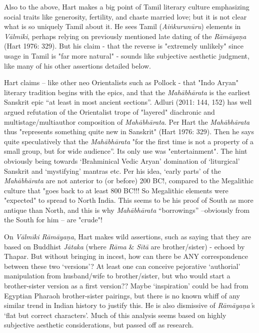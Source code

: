 Also to the above, Hart makes a big point of Tamil literary culture emphasizing social traits like generosity, fertility, and chaste married love; but it is not clear what is so uniquely Tamil about it. He sees Tamil (\textit{Aiṅkurunūru}) elements in \textit{Vālmīki}, perhaps relying on previously mentioned late dating of the \textit{Rāmāyaṇa} (Hart 1976: 329). But his claim - that the reverse is "extremely unlikely" since usage in Tamil is "far more natural" - sounds like subjective aesthetic judgment, like many of his other assertions detailed below.

Hart claims – like other neo Orientalists such as Pollock - that "Indo Aryan" literary tradition begins with the epics, and that the \textit{Mahābhārata} is the earliest Sanskrit epic “at least in most ancient sections”. Adluri (2011: 144, 152) has well argued refutation of the Orientalist trope of "layered" diachronic and multistage/multiauthor composition of \textit{Mahābhārata}. Per Hart the \textit{Mahābhārata} thus "represents something quite new in Sanskrit" (Hart 1976: 329). Then he says quite speculatively that the \textit{Mahābhārata } "for the first time is not a property of a small group, but for wide audience”. Its only use was "entertainment". The hint obviously being towards ‘Brahminical Vedic Aryan’ domination of ‘liturgical’ Sanskrit and ‘mystifying’ mantras etc. Per his idea, ‘early parts’ of the \textit{Mahābhārata } are not anterior to (or before) 200 BC!, compared to the Megalithic culture that "goes back to at least 800 BC!!! So Megalithic elements were "expected" to spread to North India. This seems to be his proof of South as more antique than North, and this is why \textit{Mahābhārata } “borrowings” –obviously from the South for him – are "crude"!

On \textit{Vālmīki Rāmāyaṇa}, Hart makes wild assertions, such as saying that they are based on Buddhist \textit{Jātaka } (where \textit{Rāma} \& \textit{Sītā } are brother/sister) - echoed by Thapar. But without bringing in incest, how can there be ANY correspondence between these two ‘versions’? At least one can conceive pejorative ‘authorial’ manipulation from husband/wife to brother/sister, but who would start a brother-sister version as a first version?? Maybe ‘inspiration’ could be had from Egyptian Pharaoh brother-sister pairings, but there is no known whiff of any similar trend in Indian history to justify this. He is also dismissive of \textit{Rāmāyaṇa’}s ‘flat but correct characters’. Much of this analysis seems based on highly subjective aesthetic considerations, but passed off as research.

